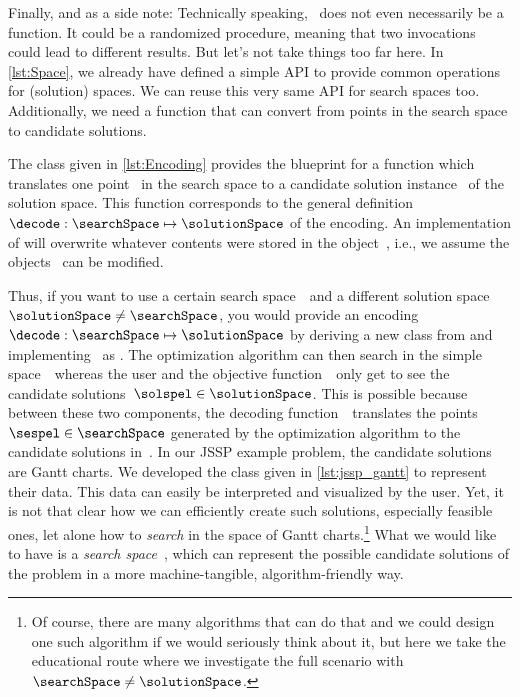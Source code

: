 Finally, and as a side note:
Technically speaking, \decode\ does not even necessarily be a function.
It could be a randomized procedure, meaning that two invocations could lead to different results.
But let's not take things too far here.%
%
\endhsection%
%
%
%
In \cref{lst:Space}, we already have defined a simple API to provide common operations for (solution) spaces.
We can reuse this very same API for search spaces too.
Additionally, we need a function that can convert from points in the search space to candidate solutions.%
%
%

The class given in \cref{lst:Encoding} provides the blueprint for a function  which translates one point~ in the search space to a candidate solution instance~ of the solution space.
This  function corresponds to the general definition~$\decode:\searchSpace\mapsto\solutionSpace$ of the encoding.
An implementation of  will overwrite whatever contents were stored in the object~, i.e., we assume the objects~ can be modified.

Thus, if you want to use a certain search space~\searchSpace\ and a different solution space~$\solutionSpace\neq\searchSpace$, you would provide an encoding~$\decode:\searchSpace\mapsto\solutionSpace$ by deriving a new class from  and implementing \decode\ as .
The optimization algorithm can then search in the simple space~\searchSpace\ whereas the user and the objective function~\objf\ only get to see the candidate solutions~$\solspel\in\solutionSpace$.
This is possible because between these two components, the decoding function~\decode\ translates the points~$\sespel\in\searchSpace$ generated by the optimization algorithm to the candidate solutions in~\solutionSpace.%
%
\endhsection%
%
%
\label{sec:jsspSearchSpace}%
%
In our \gls{JSSP} example problem, the candidate solutions are Gantt charts.
We developed the class  given in \cref{lst:jssp_gantt} to represent their data.
This data can easily be interpreted and visualized by the user.
Yet, it is not that clear how we can efficiently create such solutions, especially feasible ones, let alone how to \emph{search} in the space of Gantt charts.\footnote{%
Of course, there are many algorithms that can do that and we could design one such algorithm if we would seriously think about it, but here we take the educational route where we investigate the full scenario with~$\searchSpace\neq\solutionSpace$.} %
What we would like to have is a \emph{search space}~\searchSpace, which can represent the possible candidate solutions of the problem in a more machine-tangible, algorithm-friendly way.

